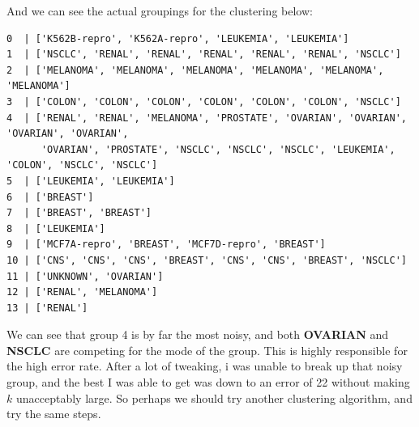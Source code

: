 \documentclass[20pt]{article} %
\begin{document}
And we can see the actual groupings for the clustering below:
\begin{verbatim}
0  | ['K562B-repro', 'K562A-repro', 'LEUKEMIA', 'LEUKEMIA']
1  | ['NSCLC', 'RENAL', 'RENAL', 'RENAL', 'RENAL', 'RENAL', 'NSCLC']
2  | ['MELANOMA', 'MELANOMA', 'MELANOMA', 'MELANOMA', 'MELANOMA', 'MELANOMA']
3  | ['COLON', 'COLON', 'COLON', 'COLON', 'COLON', 'COLON', 'NSCLC']
4  | ['RENAL', 'RENAL', 'MELANOMA', 'PROSTATE', 'OVARIAN', 'OVARIAN', 'OVARIAN', 'OVARIAN', 
      'OVARIAN', 'PROSTATE', 'NSCLC', 'NSCLC', 'NSCLC', 'LEUKEMIA', 'COLON', 'NSCLC', 'NSCLC']
5  | ['LEUKEMIA', 'LEUKEMIA']
6  | ['BREAST']
7  | ['BREAST', 'BREAST']
8  | ['LEUKEMIA']
9  | ['MCF7A-repro', 'BREAST', 'MCF7D-repro', 'BREAST']
10 | ['CNS', 'CNS', 'CNS', 'BREAST', 'CNS', 'CNS', 'BREAST', 'NSCLC']
11 | ['UNKNOWN', 'OVARIAN']
12 | ['RENAL', 'MELANOMA']
13 | ['RENAL']
\end{verbatim}
We can see that group 4 is by far the most noisy, and both \textbf{OVARIAN} and \textbf{NSCLC} are competing for the mode of the group.  This is highly responsible for the high error rate.   After a lot of tweaking, i was unable to break up that noisy group, and the best I was able to get was down to an error of 22 without making $k$ unacceptably large.  So perhaps we should try another clustering algorithm, and try the same steps.
\end{document}
